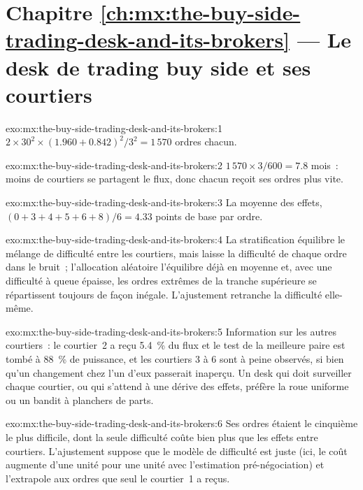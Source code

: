 \section*{Chapitre \ref{ch:mx:the-buy-side-trading-desk-and-its-brokers} --- Le desk de trading buy side et ses courtiers}

\begin{solution}{exo:mx:the-buy-side-trading-desk-and-its-brokers:1}
$2\times30^2\times(1.960+0.842)^2/3^2=1\,570$ ordres chacun.
\end{solution}

\begin{solution}{exo:mx:the-buy-side-trading-desk-and-its-brokers:2}
$1\,570\times3/600=7.8$ mois~: moins de courtiers se partagent le flux, donc chacun reçoit ses ordres plus vite.
\end{solution}

\begin{solution}{exo:mx:the-buy-side-trading-desk-and-its-brokers:3}
La moyenne des effets, $(0+3+4+5+6+8)/6=4.33$ points de base par ordre.
\end{solution}

\begin{solution}{exo:mx:the-buy-side-trading-desk-and-its-brokers:4}
La stratification équilibre le mélange de difficulté entre les courtiers, mais laisse la difficulté de chaque ordre dans le bruit~; l'allocation
aléatoire l'équilibre déjà en moyenne et, avec une difficulté à queue épaisse, les ordres extrêmes de la tranche supérieure se répartissent toujours de façon inégale. L'ajustement retranche la difficulté elle-même.
\end{solution}

\begin{solution}{exo:mx:the-buy-side-trading-desk-and-its-brokers:5}
Information sur les autres courtiers~: le courtier~2 a reçu 5.4~\% du flux et le test de la meilleure paire est tombé à 88~\% de puissance, et les courtiers 3 à 6 sont à peine
observés, si bien qu'un changement chez l'un d'eux passerait inaperçu. Un desk qui doit surveiller chaque courtier, ou qui s'attend à une dérive des effets, préfère la roue uniforme
ou un bandit à planchers de parts.
\end{solution}

\begin{solution}{exo:mx:the-buy-side-trading-desk-and-its-brokers:6}
Ses ordres étaient le cinquième le plus difficile, dont la seule difficulté coûte bien plus que les effets entre courtiers. L'ajustement suppose que le modèle de difficulté
est juste (ici, le coût augmente d'une unité pour une unité avec l'estimation pré-négociation) et l'extrapole aux ordres que seul le courtier~1 a reçus.
\end{solution}

